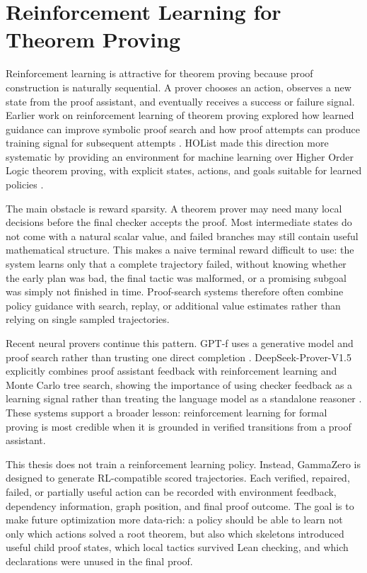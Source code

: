 \section{Reinforcement Learning for Theorem Proving}

Reinforcement learning is attractive for theorem proving because proof construction is naturally
sequential. A prover chooses an action, observes a new state from the proof assistant, and eventually
receives a success or failure signal. Earlier work on reinforcement learning of theorem proving explored
how learned guidance can improve symbolic proof search and how proof attempts can produce training
signal for subsequent attempts \citep{kaliszyk2018reinforcement}. HOList made this direction more
systematic by providing an environment for machine learning over Higher Order Logic theorem proving,
with explicit states, actions, and goals suitable for learned policies \citep{bansal2019holist}.

The main obstacle is reward sparsity. A theorem prover may need many local decisions before the final
checker accepts the proof. Most intermediate states do not come with a natural scalar value, and failed
branches may still contain useful mathematical structure. This makes a naive terminal reward difficult to
use: the system learns only that a complete trajectory failed, without knowing whether the early plan was
bad, the final tactic was malformed, or a promising subgoal was simply not finished in time. Proof-search
systems therefore often combine policy guidance with search, replay, or additional value estimates rather
than relying on single sampled trajectories.

Recent neural provers continue this pattern. GPT-f uses a generative model and proof search rather than
trusting one direct completion \citep{polu2020gptf}. DeepSeek-Prover-V1.5 explicitly combines proof
assistant feedback with reinforcement learning and Monte Carlo tree search, showing the importance of
using checker feedback as a learning signal rather than treating the language model as a standalone
reasoner \citep{xin2024deepseekproverv15}. These systems support a broader lesson: reinforcement
learning for formal proving is most credible when it is grounded in verified transitions from a proof
assistant.

This thesis does not train a reinforcement learning policy. Instead, GammaZero is designed to generate RL-compatible scored
trajectories. Each verified, repaired, failed, or partially useful action can be recorded with environment
feedback, dependency information, graph position, and final proof outcome. The goal is to make future
optimization more data-rich: a policy should be able to learn not only which actions solved a root theorem,
but also which skeletons introduced useful child proof states, which local tactics survived Lean checking,
and which declarations were unused in the final proof.

